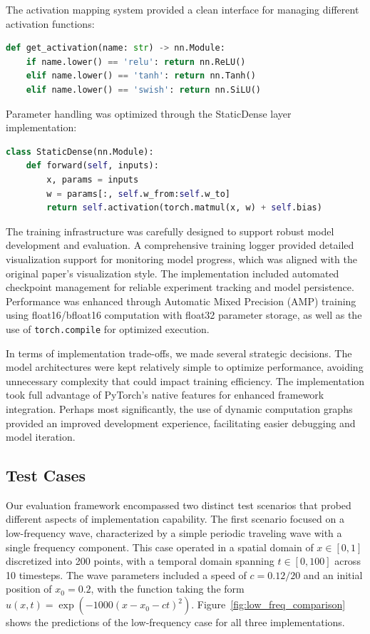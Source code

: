 \documentclass[10pt,journal,compsoc,onecolumn]{IEEEtran}
\begin{document}
The activation mapping system provided a clean interface for managing different activation functions:

\begin{lstlisting}[language=Python]
def get_activation(name: str) -> nn.Module:
    if name.lower() == 'relu': return nn.ReLU()
    elif name.lower() == 'tanh': return nn.Tanh()
    elif name.lower() == 'swish': return nn.SiLU()
\end{lstlisting}

Parameter handling was optimized through the StaticDense layer implementation:

\begin{lstlisting}[language=Python]
class StaticDense(nn.Module):
    def forward(self, inputs):
        x, params = inputs
        w = params[:, self.w_from:self.w_to]
        return self.activation(torch.matmul(x, w) + self.bias)
\end{lstlisting}

The training infrastructure was carefully designed to support robust model development and evaluation. A comprehensive training logger provided detailed visualization support for monitoring model progress, which was aligned with the original paper's visualization style. The implementation included automated checkpoint management for reliable experiment tracking and model persistence. Performance was enhanced through Automatic Mixed Precision (AMP) training using float16/bfloat16 computation with float32 parameter storage, as well as the use of \texttt{torch.compile} for optimized execution.

In terms of implementation trade-offs, we made several strategic decisions. The model architectures were kept relatively simple to optimize performance, avoiding unnecessary complexity that could impact training efficiency. The implementation took full advantage of PyTorch's native features for enhanced framework integration. Perhaps most significantly, the use of dynamic computation graphs provided an improved development experience, facilitating easier debugging and model iteration.

\subsection{Test Cases}
Our evaluation framework encompassed two distinct test scenarios that probed different aspects of implementation capability. The first scenario focused on a low-frequency wave, characterized by a simple periodic traveling wave with a single frequency component. This case operated in a spatial domain of $x \in [0,1]$ discretized into 200 points, with a temporal domain spanning $t \in [0,100]$ across 10 timesteps. The wave parameters included a speed of $c = 0.12/20$ and an initial position of $x_0 = 0.2$, with the function taking the form $u(x,t) = \exp(-1000(x-x_0-ct)^2)$. Figure~\ref{fig:low_freq_comparison} shows the predictions of the low-frequency case for all three implementations.
\end{document}

